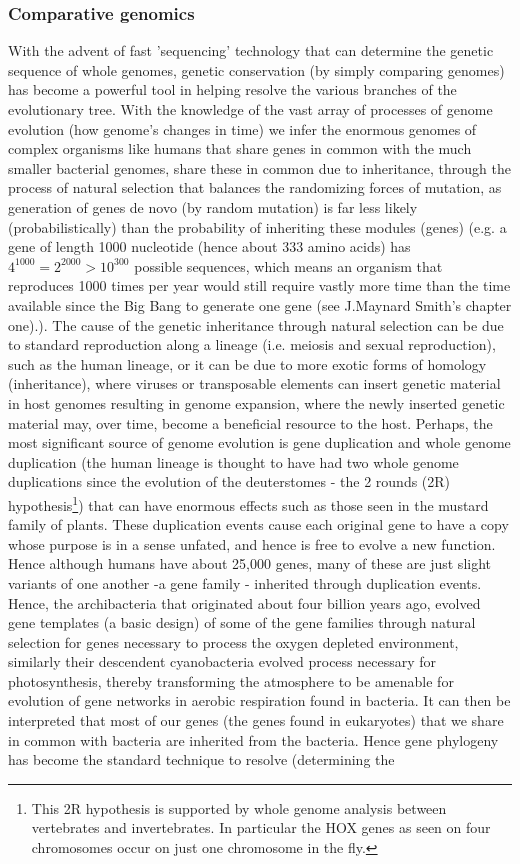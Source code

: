 \subsubsection*{Comparative genomics}
With the advent of fast 'sequencing' technology that can determine the genetic sequence of whole genomes, genetic conservation (by simply comparing genomes) has become a powerful tool in helping resolve the various branches of the evolutionary tree.  With the knowledge of the vast array of processes of genome evolution (how genome's changes in time) we infer the enormous genomes of complex organisms like humans that share genes in common with the much smaller bacterial genomes, share these in common due to inheritance, through the process of natural selection that balances the randomizing forces of mutation, as generation of genes de novo (by random mutation) is far less likely (probabilistically) than the probability of inheriting these modules (genes) (e.g. a gene of length 1000 nucleotide (hence about 333 amino acids) has $4^{1000}=2^{2000} > 10^{300}$ possible sequences, which means an organism that reproduces 1000 times per year would still require vastly more time than the time available since the Big Bang to generate one gene (see J.Maynard Smith's chapter one\cite{maynard}).).  The cause of the genetic inheritance through natural selection can be due to standard reproduction along a lineage (i.e. meiosis and sexual reproduction), such as the human lineage, or it can be due to more exotic forms of homology (inheritance), where viruses or transposable elements can insert genetic material in host genomes resulting in genome expansion, where the newly inserted genetic material may, over time, become a beneficial resource to the host.  Perhaps, the most significant source of genome evolution is gene duplication and whole genome duplication (the human lineage is thought to have had two whole genome duplications since the evolution of the deuterstomes - the 2 rounds (2R) hypothesis\footnote{This 2R hypothesis is supported by whole genome analysis between vertebrates and invertebrates.  In particular the HOX genes as seen on four chromosomes occur on just one chromosome in the fly.}) that can have enormous effects such as those seen in the mustard family of plants.  These duplication events cause each original gene to have a copy whose purpose is in a sense unfated, and hence is free to evolve a new function.  Hence although humans have about 25,000 genes, many of these are just slight variants of one another -a gene family - inherited through duplication events.  Hence, the archibacteria that originated about four billion years ago, evolved gene templates (a basic design) of some of the gene families through natural selection for genes necessary to process the oxygen depleted environment, similarly their descendent cyanobacteria evolved process necessary for photosynthesis, thereby transforming the atmosphere to be amenable for evolution of gene networks in aerobic respiration found in bacteria.  It can then be interpreted that most of our genes (the genes found in eukaryotes) that we share in common with bacteria are inherited from the bacteria.  Hence gene phylogeny has become the standard technique to resolve (determining the 